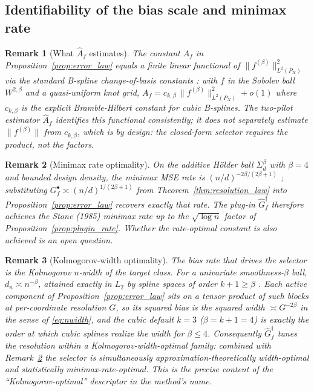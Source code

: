 \documentclass{article}
\newtheorem{remark}{Remark}
\begin{document}
\subsection{Identifiability of the bias scale and minimax rate}
\label{app:identifiability}

\begin{remark}[What $\widehat A_f$ estimates]
\label{rem:identifiability}
The constant $A_f$ in Proposition~\ref{prop:error_law} equals a finite linear functional of $\|f^{(\beta)}\|_{L^2(P_X)}^2$ via the standard B-spline change-of-basis constants \citep{deboor2001,schumaker2007}: with $f$ in the Sobolev ball $W^{2,\beta}$ and a quasi-uniform knot grid, $A_f = c_{k,\beta}\,\|f^{(\beta)}\|_{L^2(P_X)}^2 + o(1)$ where $c_{k,\beta}$ is the explicit Bramble-Hilbert constant for cubic B-splines. The two-pilot estimator $\widehat A_f$ identifies this functional consistently; it does not separately estimate $\|f^{(\beta)}\|$ from $c_{k,\beta}$, which is by design: the closed-form selector requires the product, not the factors.
\end{remark}

\begin{remark}[Minimax rate optimality]
\label{rem:minimax}
On the additive H\"older ball $\Sigma^{\beta}_d$ with $\beta = 4$ and bounded design density, the minimax MSE rate is $(n/d)^{-2\beta/(2\beta+1)}$ \citep{stone1985,stone1982}; substituting $G_f^\bullet \asymp (n/d)^{1/(2\beta+1)}$ from Theorem~\ref{thm:resolution_law} into Proposition~\ref{prop:error_law} recovers exactly that rate. The plug-in $\widehat G_f^\dagger$ therefore achieves the Stone (1985) minimax rate up to the $\sqrt{\log n}$ factor of Proposition~\ref{prop:plugin_rate}. Whether the rate-optimal constant is also achieved is an open question.
\end{remark}

\begin{remark}[Kolmogorov-width optimality]
\label{rem:kolmogorov_width}
The bias rate that drives the selector is the Kolmogorov $n$-width of the target class. For a univariate smoothness-$\beta$ ball, $d_n\asymp n^{-\beta}$, attained \emph{exactly} in $L_2$ by spline spaces of order $k+1\ge\beta$ \citep{kolmogorov1936,melkman1978,pinkus1985}. Each active component of Proposition~\ref{prop:error_law} sits on a tensor product of such blocks at per-coordinate resolution $G$, so its squared bias is the squared width $\asymp G^{-2\beta}$ in the sense of \eqref{eq:nwidth}, and the cubic default $k=3$ ($\beta=k+1=4$) is exactly the order at which cubic splines realize the width for $\beta\le 4$. Consequently $\widehat G_f^\dagger$ tunes the resolution within a Kolmogorov-width-optimal family: combined with Remark~\ref{rem:minimax} the selector is simultaneously approximation-theoretically width-optimal and statistically minimax-rate-optimal. This is the precise content of the ``Kolmogorov-optimal'' descriptor in the method's name.
\end{remark}
\end{document}
